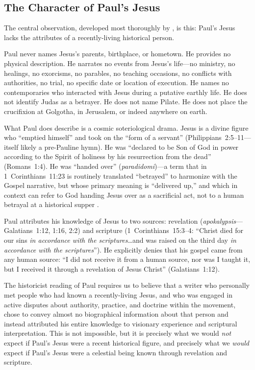\documentclass[12pt,oneside]{article}
\newcommand{\grk}[1]{\textit{#1}}   %
\begin{document}
\subsection{The Character of Paul's Jesus}
\label{sec:paul:character}

The central observation, developed most thoroughly by
\citet{Doherty1999,Doherty2009}, is this: Paul's Jesus lacks the
attributes of a recently-living historical person.

Paul never names Jesus's parents, birthplace, or hometown.  He provides
no physical description.  He narrates no events from Jesus's life---no
ministry, no healings, no exorcisms, no parables, no teaching occasions,
no conflicts with authorities, no trial, no specific date or location of
execution.  He names no contemporaries who interacted with Jesus during
a putative earthly life.  He does not identify Judas as a betrayer.  He
does not name Pilate.  He does not place the crucifixion at Golgotha, in
Jerusalem, or indeed anywhere on earth.

What Paul does describe is a cosmic soteriological drama.  Jesus is a
divine figure who ``emptied himself'' and took on the ``form of a
servant'' (Philippians~2:5--11---itself likely a pre-Pauline hymn).  He
was ``declared to be Son of God in power according to the Spirit of
holiness by his resurrection from the dead'' (Romans~1:4).  He was
``handed over'' (\grk{paradidomi})---a term that in 1~Corinthians~11:23
is routinely translated ``betrayed'' to harmonize with the Gospel
narrative, but whose primary meaning is ``delivered up,'' and which in
context can refer to God handing Jesus over as a sacrificial act, not to
a human betrayal at a historical supper \citep{Doherty2009,Carrier2014}.

Paul attributes his knowledge of Jesus to two sources: revelation
(\grk{apokalypsis}---Galatians~1:12, 1:16, 2:2) and scripture
(1~Corinthians~15:3--4: ``Christ died for our sins \textit{in
accordance with the scriptures}\ldots and was raised on the third day
\textit{in accordance with the scriptures}'').  He explicitly denies
that his gospel came from any human source: ``I did not receive it from
a human source, nor was I taught it, but I received it through a
revelation of Jesus Christ'' (Galatians~1:12).

The historicist reading of Paul requires us to believe that a writer who
personally met people who had known a recently-living Jesus, and who was
engaged in active disputes about authority, practice, and doctrine
within the movement, chose to convey almost no biographical information
about that person and instead attributed his entire knowledge to
visionary experience and scriptural interpretation.  This is not
impossible, but it is precisely what we would \textit{not} expect if
Paul's Jesus were a recent historical figure, and precisely what we
\textit{would} expect if Paul's Jesus were a celestial being known
through revelation and scripture.
\end{document}
